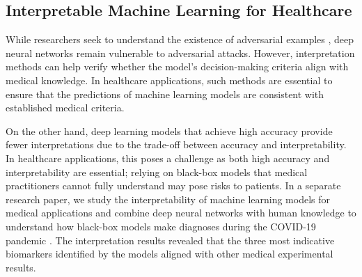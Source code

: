 \subsection{Interpretable Machine Learning for Healthcare}

While researchers seek to understand the existence of adversarial examples \citep{Sutton_2024, li2023adversarial, li2023adversarial}, deep neural networks remain vulnerable to adversarial attacks. However, interpretation methods can help verify whether the model's decision-making criteria align with medical knowledge. In healthcare applications, such methods are essential to ensure that the predictions of machine learning models are consistent with established medical criteria.

On the other hand, deep learning models that achieve high accuracy provide fewer interpretations due to the trade-off between accuracy and interpretability. In healthcare applications, this poses a challenge as both high accuracy and interpretability are essential; relying on black-box models that medical practitioners cannot fully understand may pose risks to patients. In a separate research paper, we study the interpretability of machine learning models for medical applications and combine deep neural networks with human knowledge to understand how black-box models make diagnoses during the COVID-19 pandemic \citep{han2021interpret}. The interpretation results revealed that the three most indicative biomarkers identified by the models aligned with other medical experimental results.






